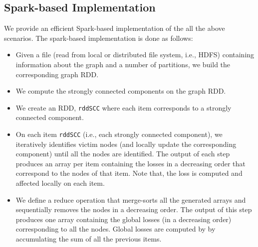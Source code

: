 \subsection{Spark-based Implementation}
We provide an efficient Spark-based implementation of the all the above scenarios. %
%
%
The spark-based implementation is done as follows:
\begin{itemize}
\item Given a file (read from local or distributed file system, i.e., HDFS) containing information about the graph and a number of partitions, we build the corresponding graph RDD. 
\item We compute the strongly connected components on the graph RDD. 
\item We create an RDD, \texttt{rddSCC} where each item corresponds to a strongly connected component. 
\item On each item \texttt{rddSCC} (i.e., each strongly connected component), we iteratively identifies victim nodes (and locally update the corresponding component) until all the nodes are identified. The output of each step produces an array per item containing the losses in a decreasing order that correspond to the nodes of that item. Note that, the loss is computed and affected locally on each item. 
\item We define a reduce operation that merge-sorts all the generated arrays and sequentially removes the nodes in a decreasing order. The output of this step produces one array containing the global losses (in a decreasing order) corresponding to all the nodes. Global losses are computed by by accumulating the sum of all the previous items. 
\end{itemize}




